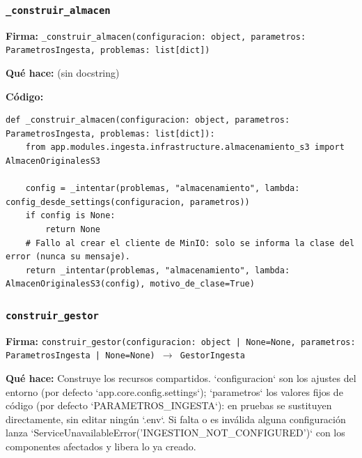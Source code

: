 \documentclass[11pt,a4paper]{article}
\begin{document}
\subsubsection*{\texttt{\_construir\_almacen}}
\textbf{Firma:} \texttt{\_construir\_almacen(configuracion: object, parametros: ParametrosIngesta, problemas: list[dict])}

\textbf{Qué hace:} (sin docstring)

\textbf{Código:}
\begin{lstlisting}
def _construir_almacen(configuracion: object, parametros: ParametrosIngesta, problemas: list[dict]):
    from app.modules.ingesta.infrastructure.almacenamiento_s3 import AlmacenOriginalesS3

    config = _intentar(problemas, "almacenamiento", lambda: config_desde_settings(configuracion, parametros))
    if config is None:
        return None
    # Fallo al crear el cliente de MinIO: solo se informa la clase del error (nunca su mensaje).
    return _intentar(problemas, "almacenamiento", lambda: AlmacenOriginalesS3(config), motivo_de_clase=True)
\end{lstlisting}

\subsubsection*{\texttt{construir\_gestor}}
\textbf{Firma:} \texttt{construir\_gestor(configuracion: object | None=None, parametros: ParametrosIngesta | None=None) $\rightarrow$ GestorIngesta}

\textbf{Qué hace:} Construye los recursos compartidos. `configuracion` son los ajustes del entorno (por defecto
`app.core.config.settings`); `parametros` los valores fijos de código (por defecto `PARAMETROS\_INGESTA`): en pruebas se
sustituyen directamente, sin editar ningún `.env`. Si falta o es inválida alguna configuración lanza
`ServiceUnavailableError('INGESTION\_NOT\_CONFIGURED')` con los componentes afectados y libera lo ya creado.
\end{document}
